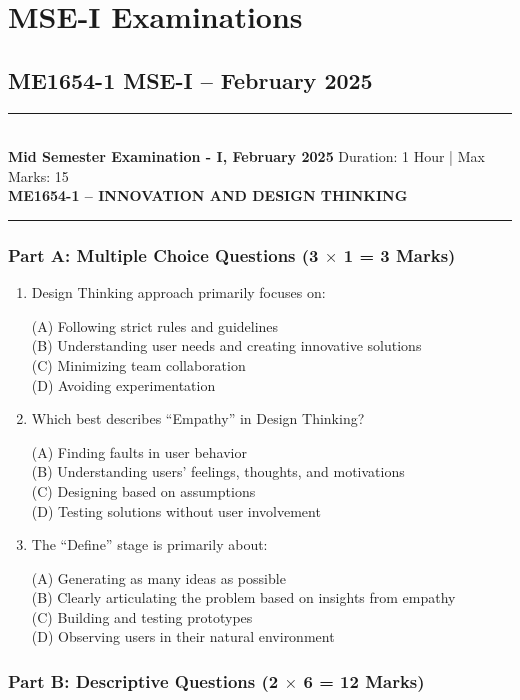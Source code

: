 \documentclass[11pt,a4paper]{article}
\newcommand{\examheader}[4]{
\noindent\rule{\textwidth}{0.5pt}\\
\textbf{#1} \hfill Duration: #3 | Max Marks: #4\\
\textbf{#2}\\
\rule{\textwidth}{0.5pt}
\vspace{0.2cm}
}
\begin{document}
\section{MSE-I Examinations}

\subsection{ME1654-1 MSE-I -- February 2025}
\examheader{Mid Semester Examination - I, February 2025}{ME1654-1 -- INNOVATION AND DESIGN THINKING}{1 Hour}{15}

\subsubsection*{Part A: Multiple Choice Questions (3 $\times$ 1 = 3 Marks)}

\begin{enumerate}
\item Design Thinking approach primarily focuses on:

(A) Following strict rules and guidelines\\
(B) Understanding user needs and creating innovative solutions\\
(C) Minimizing team collaboration\\
(D) Avoiding experimentation

\item Which best describes ``Empathy'' in Design Thinking?

(A) Finding faults in user behavior\\
(B) Understanding users' feelings, thoughts, and motivations\\
(C) Designing based on assumptions\\
(D) Testing solutions without user involvement

\item The ``Define'' stage is primarily about:

(A) Generating as many ideas as possible\\
(B) Clearly articulating the problem based on insights from empathy\\
(C) Building and testing prototypes\\
(D) Observing users in their natural environment
\end{enumerate}

\subsubsection*{Part B: Descriptive Questions (2 $\times$ 6 = 12 Marks)}
\end{document}
